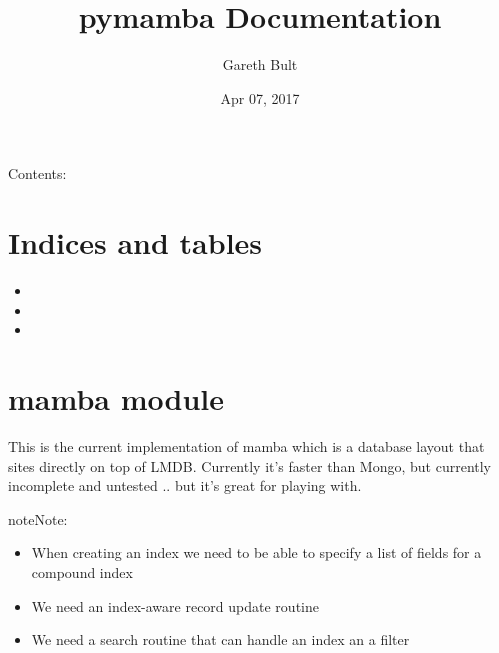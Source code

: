 \documentclass[letterpaper,10pt,english]{sphinxmanual}
\title{pymamba Documentation}
\date{Apr 07, 2017}
\author{Gareth Bult}
\begin{document}
\maketitle
\sphinxtableofcontents
{}\label{\detokenize{index::doc}}


Contents:


\chapter{Indices and tables}
\label{\detokenize{index:welcome-to-pymamba-s-documentation}}\label{\detokenize{index:indices-and-tables}}\begin{itemize}
\item {} 

\item {} 

\item {} 

\end{itemize}


\chapter{mamba module}
\label{\detokenize{index:mamba-module}}\label{\detokenize{index:module-mamba}}
This is the current implementation of \sphinxquotedblleft{}mamba\sphinxquotedblright{} which is a database layout
that sites directly on top of LMDB. Currently it's  faster than
Mongo, but currently incomplete and untested .. but it's great for 
playing with.

\begin{sphinxadmonition}{note}{Note:}\begin{itemize}
\item {} 
When creating an index we need to be able to specify a list of fields for a compound index

\item {} 
We need an index-aware record update routine

\item {} 
We need a search routine that can handle an index an a filter

\end{itemize}
\end{sphinxadmonition}
\end{document}
